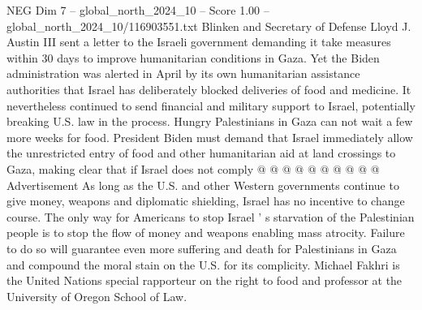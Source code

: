 \begin{textsample}{NEG Dim 7 – global\_north\_2024\_10 – Score 1.00 – global\_north\_2024\_10/116903551.txt}
Blinken and Secretary of Defense Lloyd J.
Austin III sent a letter to the Israeli government demanding it take measures within 30 days to improve humanitarian conditions in Gaza.
Yet the Biden administration was alerted in April by its own humanitarian assistance authorities that Israel has deliberately blocked deliveries of food and medicine.
It nevertheless continued to send financial and military support to Israel, potentially breaking U.S. law in the process.
Hungry Palestinians in Gaza can not wait a few more weeks for food.
President Biden must demand that Israel immediately allow the unrestricted entry of food and other humanitarian aid at land crossings to Gaza, making clear that if Israel does not comply @ @ @ @ @ @ @ @ @ @ Advertisement As long as the U.S. and other Western governments continue to give money, weapons and diplomatic shielding, Israel has no incentive to change course.
The only way for Americans to stop Israel ' s starvation of the Palestinian people is to stop the flow of money and weapons enabling mass atrocity.
Failure to do so will guarantee even more suffering and death for Palestinians in Gaza and compound the moral stain on the U.S. for its complicity.
Michael Fakhri is the United Nations special rapporteur on the right to food and professor at the University of Oregon School of Law.

\end{textsample}
